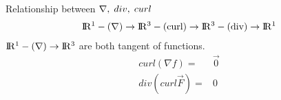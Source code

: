 \documentclass{article}
\newcommand{\R}{\rm I\!R}
\begin{document}
        Relationship between $\nabla,\;div,\;curl\\$
        \begin{align}
            \R^1 -(\nabla)\rightarrow \R^3 -(curl)\rightarrow \R^3 -(div)\rightarrow \R^1
        \end{align}
        $\R^1 -(\nabla)\rightarrow \R^3$ are both tangent of functions.
        \begin{align}
            curl(\nabla f) =& \vec{0}\\
            div(curl \vec{F}) =& 0
        \end{align}
        
        
\end{document}
